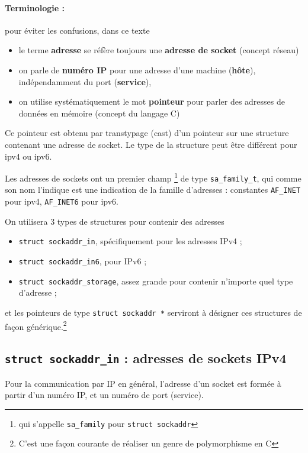 \paragraph{Terminologie :} pour éviter les confusions, dans ce texte
\begin{itemize}
\item le terme \textbf{adresse} se réfère toujours une \textbf{adresse de socket} (concept réseau)
  \item on parle de \textbf{numéro IP} pour une adresse d'une machine (\textbf{hôte}), indépendamment du port (\textbf{service}),
\item on utilise systématiquement le mot \textbf{pointeur} pour parler des
  adresses de données en mémoire (concept du langage C)
\end{itemize}

Ce pointeur est obtenu par transtypage (cast) d'un
pointeur sur une structure contenant une adresse de socket. Le type de
la structure peut être différent pour ipv4 ou ipv6.

Les adresses de sockets ont un premier champ
\footnote{qui s'appelle  \texttt{sa\_family} pour \texttt{struct sockaddr}}
de type
\texttt{sa\_family\_t}, qui comme son nom l'indique est
une indication de la famille d'adresses : constantes
\texttt{AF\_INET} pour ipv4, \texttt{AF\_INET6} pour ipv6.

On utilisera 3 types de structures pour contenir des adresses

\begin{itemize}
\item \texttt{struct sockaddr\_in},  spécifiquement pour les adresses IPv4 ;
\item \texttt{struct sockaddr\_in6}, pour IPv6 ;
\item \texttt{struct sockaddr\_storage}, assez grande pour contenir
  n'importe quel type d'adresse ;
\end{itemize}

et les pointeurs de type \texttt{struct sockaddr *} serviront à
désigner ces structures de façon générique.\footnote{C'est une façon
courante de réaliser un genre de polymorphisme en C}


\subsection{\texttt{struct sockaddr\_in} : adresses de sockets IPv4}



Pour la communication par IP en général, l'adresse d'un socket est
formée à partir d'un numéro IP, et un numéro de port (service).

